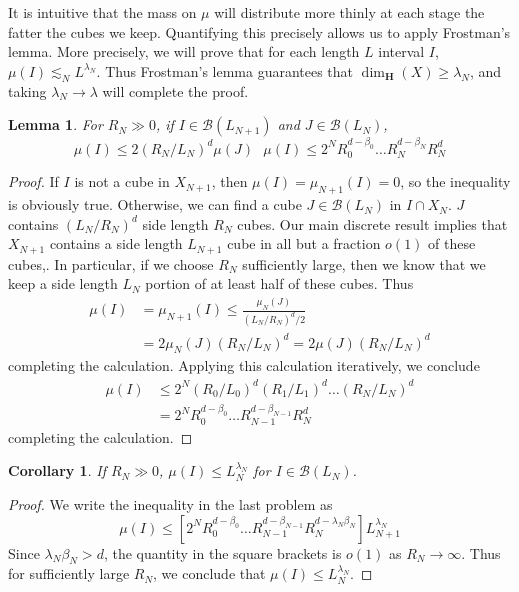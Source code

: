 \documentclass{article}
\theoremstyle{plain}
\newtheorem{lemma}{Lemma}
\newtheorem*{corollary}{Corollary}
\theoremstyle{plain}
\begin{document}
\begin{multicols}{2}
It is intuitive that the mass on $\mu$ will distribute more thinly at each stage the fatter the cubes we keep. Quantifying this precisely allows us to apply Frostman's lemma. More precisely, we will prove that for each length $L$ interval $I$, $\mu(I) \lesssim_N L^{\lambda_N}$. Thus Frostman's lemma guarantees that $\dim_{\mathbf{H}}(X) \geq \lambda_N$, and taking $\lambda_N \to \lambda$ will complete the proof.

\begin{lemma}
	For $R_N \gg 0$, if $I \in \mathcal{B}(L_{N+1})$ and $J \in \mathcal{B}(L_N)$,
	\[ \mu(I) \leq 2 (R_N/L_N)^d \mu(J)\ \ \ \mu(I) \leq 2^N R_0^{d - \beta_0} \dots R_N^{d - \beta_N} R_N^d \]
\end{lemma}
\begin{proof}
	If $I$ is not a cube in $X_{N+1}$, then $\mu(I) = \mu_{N+1}(I) = 0$, so the inequality is obviously true. Otherwise, we can find a cube $J \in \mathcal{B}(L_N)$ in $I \cap X_N$. $J$ contains $(L_N/R_N)^d$ side length $R_N$ cubes. Our main discrete result implies that $X_{N+1}$ contains a side length $L_{N+1}$ cube in all but a fraction $o(1)$ of these cubes,. In particular, if we choose $R_N$ sufficiently large, then we know that we keep a side length $L_N$ portion of at least half of these cubes. Thus
	\begin{align*}
		\mu(I) &= \mu_{N+1}(I) \leq \frac{\mu_N(J)}{(L_N/R_N)^d/2}\\
		&= 2 \mu_N(J) (R_N/L_N)^d = 2 \mu(J) (R_N/L_N)^d
	\end{align*}
	completing the calculation. Applying this calculation iteratively, we conclude
	\begin{align*}
		\mu(I) &\leq 2^N (R_0/L_0)^d (R_1/L_1)^d \dots (R_N/L_N)^d\\
		&= 2^N R_0^{d - \beta_0} \dots R_{N-1}^{d - \beta_{N-1}} R_N^d
	\end{align*}
	completing the calculation.
\end{proof}

\begin{corollary}
	If $R_N \gg 0$, $\mu(I) \leq L_N^{\lambda_N}$ for $I \in \mathcal{B}(L_N)$.
\end{corollary}
\begin{proof}
	We write the inequality in the last problem as
	\[ \mu(I) \leq [2^N R_0^{d - \beta_0} \dots R_{N-1}^{d - \beta_{N-1}} R_N^{d - \lambda_N \beta_N}] L_{N+1}^{\lambda_N} \]
	Since $\lambda_N \beta_N > d$, the quantity in the square brackets is $o(1)$ as $R_N \to \infty$. Thus for sufficiently large $R_N$, we conclude that $\mu(I) \leq L_N^{\lambda_N}$.
\end{proof}


\end{multicols}
\end{document}
